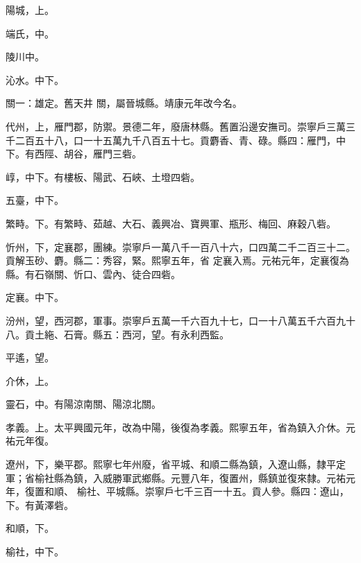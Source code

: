 \begin{pinyinscope}
 陽城，上。



 端氏，中。



 陵川中。



 沁水。中下。



 關一：雄定。舊天井
 關，屬晉城縣。靖康元年改今名。



 代州，上，雁門郡，防禦。景德二年，廢唐林縣。舊置沿邊安撫司。崇寧戶三萬三千二百五十八，口一十五萬九千八百五十七。貢麝香、青、碌。縣四：雁門，中下。有西陘、胡谷，雁門三砦。



 崞，中下。有樓板、陽武、石峽、土墱四砦。



 五臺，中下。



 繁畤。下。有繁畤、茹越、大石、義興冶、寶興軍、瓶形、梅回、麻穀八砦。



 忻州，下，定襄郡，團練。崇寧戶一萬八千一百八十六，口四萬二千二百三十二。貢解玉砂、麝。縣二：秀容，緊。熙寧五年，省
 定襄入焉。元祐元年，定襄復為縣。有石嶺關、忻口、雲內、徒合四砦。



 定襄。中下。



 汾州，望，西河郡，軍事。崇寧戶五萬一千六百九十七，口一十八萬五千六百九十八。貢土絁、石膏。縣五：西河，望。有永利西監。



 平遙，望。



 介休，上。



 靈石，中。有陽涼南關、陽涼北關。



 孝義。上。太平興國元年，改為中陽，後復為孝義。熙寧五年，省為鎮入介休。元祐元年復。



 遼州，下，樂平郡。熙寧七年州廢，省平城、和順二縣為鎮，入遼山縣，隸平定軍；省榆社縣為鎮，入威勝軍武鄉縣。元豐八年，復置州，縣鎮並復來隸。元祐元年，復置和順、
 榆社、平城縣。崇寧戶七千三百一十五。貢人參。縣四：遼山，下。有黃澤砦。



 和順，下。



 榆社，中下。




\end{pinyinscope}
